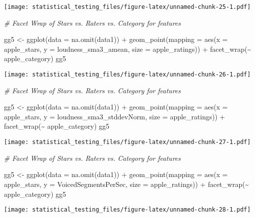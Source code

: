 \documentclass[
]{article}
\newenvironment{Shaded}{\begin{snugshade}}{\end{snugshade}}
\newcommand{\AttributeTok}[1]{\textcolor[rgb]{0.77,0.63,0.00}{#1}}
\newcommand{\CommentTok}[1]{\textcolor[rgb]{0.56,0.35,0.01}{\textit{#1}}}
\newcommand{\FunctionTok}[1]{\textcolor[rgb]{0.00,0.00,0.00}{#1}}
\newcommand{\NormalTok}[1]{#1}
\newcommand{\OtherTok}[1]{\textcolor[rgb]{0.56,0.35,0.01}{#1}}
\newcommand{\SpecialCharTok}[1]{\textcolor[rgb]{0.00,0.00,0.00}{#1}}
\begin{document}
\texttt{[image: statistical\_testing\_files/figure-latex/unnamed-chunk-25-1.pdf]}

\begin{Shaded}
\begin{Highlighting}[]
\CommentTok{\# Facet Wrap of Stars vs. Raters vs. Category for features}

\NormalTok{gg5 }\OtherTok{\textless{}{-}} \FunctionTok{ggplot}\NormalTok{(}\AttributeTok{data =} \FunctionTok{na.omit}\NormalTok{(data1)) }\SpecialCharTok{+}
  \FunctionTok{geom\_point}\NormalTok{(}\AttributeTok{mapping =} \FunctionTok{aes}\NormalTok{(}\AttributeTok{x =}\NormalTok{ apple\_stars, }\AttributeTok{y =}\NormalTok{ loudness\_sma3\_amean, }\AttributeTok{size =}\NormalTok{ apple\_ratings)) }\SpecialCharTok{+}
  \FunctionTok{facet\_wrap}\NormalTok{(}\SpecialCharTok{\textasciitilde{}}\NormalTok{ apple\_category)}
\NormalTok{gg5}
\end{Highlighting}
\end{Shaded}

\texttt{[image: statistical\_testing\_files/figure-latex/unnamed-chunk-26-1.pdf]}

\begin{Shaded}
\begin{Highlighting}[]
\CommentTok{\# Facet Wrap of Stars vs. Raters vs. Category for features}

\NormalTok{gg5 }\OtherTok{\textless{}{-}} \FunctionTok{ggplot}\NormalTok{(}\AttributeTok{data =} \FunctionTok{na.omit}\NormalTok{(data1)) }\SpecialCharTok{+}
  \FunctionTok{geom\_point}\NormalTok{(}\AttributeTok{mapping =} \FunctionTok{aes}\NormalTok{(}\AttributeTok{x =}\NormalTok{ apple\_stars, }\AttributeTok{y =}\NormalTok{ loudness\_sma3\_stddevNorm, }\AttributeTok{size =}\NormalTok{ apple\_ratings)) }\SpecialCharTok{+}
  \FunctionTok{facet\_wrap}\NormalTok{(}\SpecialCharTok{\textasciitilde{}}\NormalTok{ apple\_category)}
\NormalTok{gg5}
\end{Highlighting}
\end{Shaded}

\texttt{[image: statistical\_testing\_files/figure-latex/unnamed-chunk-27-1.pdf]}

\begin{Shaded}
\begin{Highlighting}[]
\CommentTok{\# Facet Wrap of Stars vs. Raters vs. Category for features}

\NormalTok{gg5 }\OtherTok{\textless{}{-}} \FunctionTok{ggplot}\NormalTok{(}\AttributeTok{data =} \FunctionTok{na.omit}\NormalTok{(data1)) }\SpecialCharTok{+}
  \FunctionTok{geom\_point}\NormalTok{(}\AttributeTok{mapping =} \FunctionTok{aes}\NormalTok{(}\AttributeTok{x =}\NormalTok{ apple\_stars, }\AttributeTok{y =}\NormalTok{ VoicedSegmentsPerSec, }\AttributeTok{size =}\NormalTok{ apple\_ratings)) }\SpecialCharTok{+}
  \FunctionTok{facet\_wrap}\NormalTok{(}\SpecialCharTok{\textasciitilde{}}\NormalTok{ apple\_category)}
\NormalTok{gg5}
\end{Highlighting}
\end{Shaded}

\texttt{[image: statistical\_testing\_files/figure-latex/unnamed-chunk-28-1.pdf]}
\end{document}
